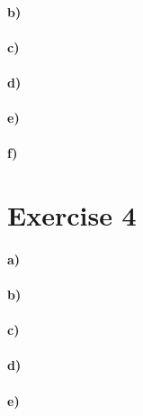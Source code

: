 \documentclass[12pt]{article}
\begin{document}
\paragraph{b)}

\paragraph{c)}

\paragraph{d)}

\paragraph{e)}

\paragraph{f)}

\section*{Exercise 4}

\paragraph{a)}

\paragraph{b)}

\paragraph{c)}

\paragraph{d)}

\paragraph{e)}
\end{document}
